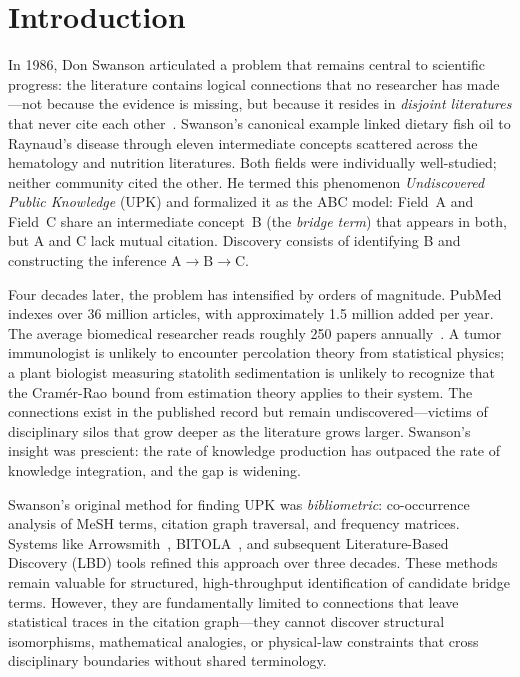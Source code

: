 \section{Introduction}
\label{sec:introduction}

In 1986, Don Swanson articulated a problem that remains central to scientific progress: the literature contains logical connections that no researcher has made---not because the evidence is missing, but because it resides in \emph{disjoint literatures} that never cite each other~\citep{swanson1986}. Swanson's canonical example linked dietary fish oil to Raynaud's disease through eleven intermediate concepts scattered across the hematology and nutrition literatures. Both fields were individually well-studied; neither community cited the other. He termed this phenomenon \emph{Undiscovered Public Knowledge} (UPK) and formalized it as the ABC model: Field~A and Field~C share an intermediate concept~B (the \emph{bridge term}) that appears in both, but A and C lack mutual citation. Discovery consists of identifying B and constructing the inference $\mathrm{A} \to \mathrm{B} \to \mathrm{C}$.

Four decades later, the problem has intensified by orders of magnitude. PubMed indexes over 36 million articles, with approximately 1.5 million added per year. The average biomedical researcher reads roughly 250 papers annually~\citep{tenopir2009}. A tumor immunologist is unlikely to encounter percolation theory from statistical physics; a plant biologist measuring statolith sedimentation is unlikely to recognize that the Cram\'{e}r-Rao bound from estimation theory applies to their system. The connections exist in the published record but remain undiscovered---victims of disciplinary silos that grow deeper as the literature grows larger. Swanson's insight was prescient: the rate of knowledge production has outpaced the rate of knowledge integration, and the gap is widening.

Swanson's original method for finding UPK was \emph{bibliometric}: co-occurrence analysis of MeSH terms, citation graph traversal, and frequency matrices. Systems like Arrowsmith~\citep{smalheiser2009}, BITOLA~\citep{hristovski2006}, and subsequent Literature-Based Discovery (LBD) tools refined this approach over three decades. These methods remain valuable for structured, high-throughput identification of candidate bridge terms. However, they are fundamentally limited to connections that leave statistical traces in the citation graph---they cannot discover structural isomorphisms, mathematical analogies, or physical-law constraints that cross disciplinary boundaries without shared terminology.

